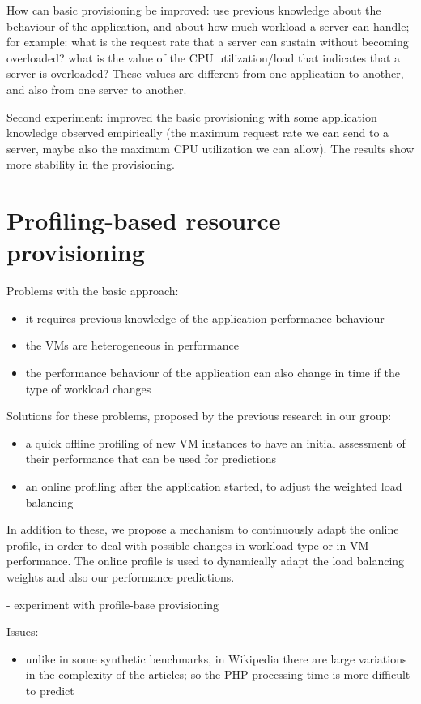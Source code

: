 \documentclass[10pt,twocolumn]{article}
\begin{document}
How can basic provisioning be improved: use previous knowledge about the behaviour
of the application, and about how much workload a server can handle; for example:
what is the request rate that a server can sustain without becoming overloaded?
what is the value of the CPU utilization/load that indicates that a server is
overloaded? These values are different from one application to another, and also
from one server to another. 

Second experiment: improved the basic provisioning with some application knowledge
observed empirically (the maximum request rate we can send to a server, maybe also
the maximum CPU utilization we can allow). The results show more stability in the
provisioning.  


\section*{Profiling-based resource provisioning}


Problems with the basic approach:
\begin{itemize}
\item it requires previous knowledge of the application performance behaviour
\item the VMs are heterogeneous in performance
\item the performance behaviour of the application can also change in time
if the type of workload changes
\end{itemize}

Solutions for these problems, proposed by the previous research in our group:
\begin{itemize}
\item a quick offline profiling of new VM instances to have an initial assessment
of their performance that can be used for predictions
\item an online profiling after the application started, to adjust the weighted
load balancing
\end{itemize}

In addition to these, we propose a mechanism to continuously adapt the online profile,
in order to deal with possible changes in workload type or in VM performance.
The online profile is used to dynamically adapt the load balancing weights and
also our performance predictions.

- experiment with profile-base provisioning


Issues:
\begin{itemize}
\item unlike in some synthetic benchmarks, in Wikipedia there are large variations
in the complexity of the articles; so the PHP processing time is more difficult 
to predict
\end{itemize}
\end{document}
